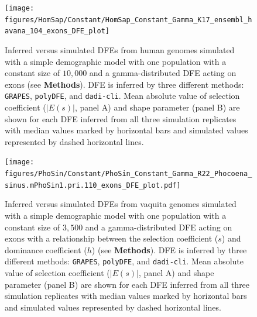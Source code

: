 \documentclass[hidelinks]{article}
\newcommand{\polydfe}{\texttt{polyDFE}\xspace}
\newcommand{\dadicli}{\texttt{dadi-cli}\xspace}
\newcommand{\grapes}{\texttt{GRAPES}\xspace}
\begin{document}
\begin{figure}[h]
    \centering
    \texttt{[image: figures/HomSap/Constant/HomSap\_Constant\_Gamma\_K17\_ensembl\_havana\_104\_exons\_DFE\_plot]}
    \caption{
       Inferred versus simulated DFEs from human genomes simulated with
       a simple demographic model with one population with a constant size of $10,000$
       and a gamma-distributed DFE acting on exons (see \textbf{Methods}).
        DFE is inferred by three different methods: \grapes, \polydfe , and \dadicli.
        Mean absolute value of selection coefficient ($\lvert E(s) \rvert$, panel A) and shape parameter (panel B)
        are shown for each DFE inferred from all three simulation replicates
        with median values marked by horizontal bars
        and simulated values represented by dashed horizontal lines.
    }
    \label{fig:homsap-dfe.constant}
\end{figure}

\begin{figure}[h]
    \centering
    \texttt{[image: figures/PhoSin/Constant/PhoSin\_Constant\_Gamma\_R22\_Phocoena\_sinus.mPhoSin1.pri.110\_exons\_DFE\_plot.pdf]}
    \caption{
    \label{fig:vaquita-dfe.constant}
        Inferred versus simulated DFEs from vaquita genomes simulated with
        a simple demographic model with one population with a constant size of $3,500$
        and a gamma-distributed DFE acting on exons
        with a relationship between the selection coefficient ($s$) and dominance coefficient ($h$) (see \textbf{Methods}).
        DFE is inferred by three different methods: \grapes, \polydfe , and \dadicli.
        Mean absolute value of selection coefficient ($\lvert E(s) \rvert$, panel A) and shape parameter (panel B)
        are shown for each DFE inferred from all three simulation replicates
        with median values marked by horizontal bars
        and simulated values represented by dashed horizontal lines.
    }
\end{figure}
\end{document}
